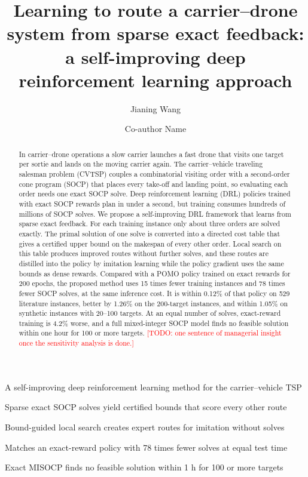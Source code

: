 \documentclass[preprint,review,12pt,authoryear]{elsarticle}
\newcommand{\todo}[1]{\textcolor{red}{[TODO: #1]}}
\begin{document}
\begin{frontmatter}

\title{Learning to route a carrier--drone system from sparse exact feedback:
a self-improving deep reinforcement learning approach}

\author[a]{Jianing Wang}
\author[a]{Co-author Name}

\begin{abstract}
In carrier--drone operations a slow carrier launches a fast drone that visits one target per sortie and
lands on the moving carrier again. The carrier--vehicle traveling salesman problem
(CVTSP) couples a combinatorial visiting order with a second-order cone program (SOCP) that places every
take-off and landing point, so evaluating each order needs one exact SOCP solve. Deep reinforcement learning
(DRL) policies trained with exact SOCP rewards plan in under a second, but training
consumes hundreds of millions of SOCP solves. We propose a self-improving DRL framework that learns from
sparse exact feedback. For each training instance only about three orders are solved exactly. The primal
solution of one solve is converted into a directed cost table that gives a certified upper bound on the
makespan of every other order. Local search on this table produces improved routes without further solves,
and these routes are distilled into the policy by imitation learning while the policy gradient uses the same
bounds as dense rewards. Compared with a POMO policy trained on exact rewards for 200 epochs, the proposed
method uses 15 times fewer training instances and 78 times fewer SOCP solves, at the same inference cost.
It is within 0.12\% of that policy on 529 literature instances, better by 1.26\% on the 200-target instances,
and within 1.05\% on synthetic instances with 20--100 targets. At an equal number of solves, exact-reward
training is 4.2\% worse, and a full mixed-integer SOCP model finds no feasible solution within one hour
for 100 or more targets.
\todo{one sentence of managerial insight once the sensitivity analysis is done.}
\end{abstract}

\begin{highlights}
\item A self-improving deep reinforcement learning method for the carrier--vehicle TSP
\item Sparse exact SOCP solves yield certified bounds that score every other route
\item Bound-guided local search creates expert routes for imitation without solves
\item Matches an exact-reward policy with 78 times fewer solves at equal test time
\item Exact MISOCP finds no feasible solution within 1 h for 100 or more targets
\end{highlights}


\end{frontmatter}
\end{document}
